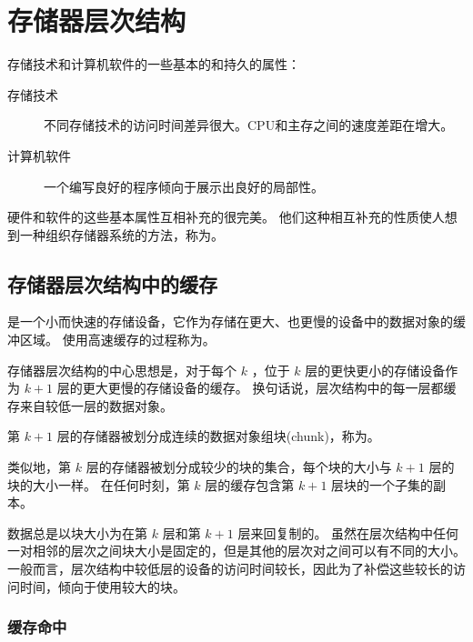 
\section{存储器层次结构}
{
    存储技术和计算机软件的一些基本的和持久的属性：

    \begin{description}
        \item[存储技术] 不同存储技术的访问时间差异很大。CPU和主存之间的速度差距在增大。
        \item[计算机软件] 一个编写良好的程序倾向于展示出良好的局部性。
    \end{description}

    硬件和软件的这些基本属性互相补充的很完美。
    他们这种相互补充的性质使人想到一种组织存储器系统的方法，称为。

    \subsection{存储器层次结构中的缓存}
    {
        是一个小而快速的存储设备，它作为存储在更大、也更慢的设备中的数据对象的缓冲区域。
        使用高速缓存的过程称为。

        存储器层次结构的中心思想是，对于每个 $k$ ，位于 $k$ 层的更快更小的存储设备作为 $k + 1$ 层的更大更慢的存储设备的缓存。
        换句话说，层次结构中的每一层都缓存来自较低一层的数据对象。

        第 $k + 1$ 层的存储器被划分成连续的数据对象组块(chunk)，称为。

        类似地，第 $k$ 层的存储器被划分成较少的块的集合，每个块的大小与 $k + 1$ 层的块的大小一样。
        在任何时刻，第 $k$ 层的缓存包含第 $k + 1$ 层块的一个子集的副本。

        数据总是以块大小为在第 $k$ 层和第 $k + 1$ 层来回复制的。
        虽然在层次结构中任何一对相邻的层次之间块大小是固定的，但是其他的层次对之间可以有不同的大小。
        一般而言，层次结构中较低层的设备的访问时间较长，因此为了补偿这些较长的访问时间，倾向于使用较大的块。

        \subsubsection{缓存命中}
        {

        }
    }
}

